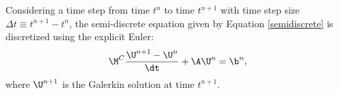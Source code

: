 Considering a time step from time $t^n$ to time $t^{n+1}$ with time step size
$\Delta t\equiv t^{n+1}-t^n$, the semi-discrete equation given by Equation
\eqref{semidiscrete} is discretized using the explicit Euler:
\begin{equation}\label{galerkin_FE}
   \M^C\frac{\U^{n+1}-\U^n}{\dt} + \A\U^n = \b^n,
\end{equation}
where $\U^{n+1}$ is the Galerkin solution at time $t^{n+1}$.

